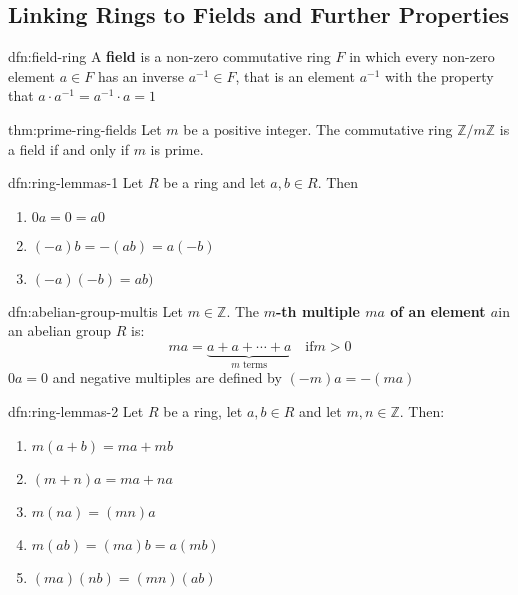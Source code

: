 \documentclass[landscape, 8pt]{extarticle}
\begin{document}
\begin{multicols}{3}
\subsection{Linking Rings to Fields and Further Properties}

\begin{dfn}{dfn:field-ring}{}
    A \textbf{field} is a non-zero commutative ring $F$ in which every non-zero element $a\in F$ has an inverse $a^{-1}\in F$, that is an element $a^{-1}$ with the property that $a \cdot a^{-1} = a^{-1} \cdot a = 1$
\end{dfn}

\begin{thm}{thm:prime-ring-fields}{}
    Let $m$ be a positive integer. The commutative ring $\mathbb{Z} / m\mathbb{Z}$ is a field if and only if $m$ is prime.
\end{thm}

\begin{thm}{dfn:ring-lemmas-1}{}
    Let $R$ be a ring and let $a,b\in R$. Then
    \begin{enumerate}
        \item $0a = 0 = a 0$
        \item $(-a)b = -(ab) = a(-b)$
        \item $(-a)(-b) = ab)$
    \end{enumerate}
\end{thm}


\begin{dfn}{dfn:abelian-group-multis}{}
    Let $m\in \mathbb{Z}$. The \textbf{$m$-th multiple $ma$ of an element $a$}in an abelian group $R$ is:
    \[ma = \underbrace{a + a + \cdots + a}_{\text{$m$ terms}} \quad \text{if} m > 0\]
    $0a = 0$ and negative multiples are defined by $(-m)a = -(ma)$
\end{dfn}

\begin{thm}{dfn:ring-lemmas-2}{}
    Let $R$ be a ring, let $a,b\in R$ and let $m,n\in \mathbb{Z}$. Then:
    \begin{enumerate}
        \item $m(a + b) = ma + mb$
        \item $(m + n)a = ma + na$
        \item $m(na) = (mn)a$
        \item $m(ab) = (ma)b = a(mb)$
        \item $(ma)(nb) = (mn)(ab)$
    \end{enumerate}
\end{thm}


\end{multicols}
\end{document}
